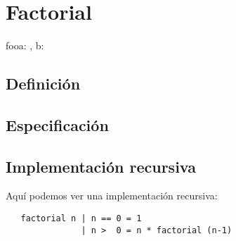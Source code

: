 \documentclass{article}
\begin{document}
\section{Factorial}


\begin{proc}{foo}{\In a: \ent, \Out b: \TLista{\ent}}{}
\end{proc}




\subsection{Definición}



\subsection{Especificación}


\subsection{Implementación recursiva}

Aquí podemos ver una implementación recursiva:

\begin{verbatim}
   factorial n | n == 0 = 1
               | n >  0 = n * factorial (n-1)
\end{verbatim}
\end{document}
